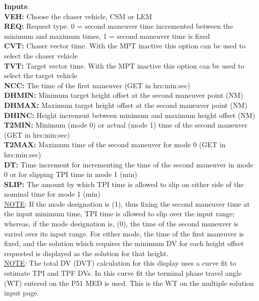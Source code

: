 \documentclass[11pt]{article} %
\begin{document}
\textbf{Inputs}:\\

\textbf{VEH:} Choose the chaser vehicle, CSM or LEM\\
\textbf{REQ:} Request type. 0 = second maneuver time incremented between the minimum and maximum times, 1 = second maneuver time is fixed\\
\textbf{CVT:} Chaser vector time. With the MPT inactive this option can be used to select the chaser vehicle\\
\textbf{TVT:} Target vector time. With the MPT inactive this option can be used to select the target vehicle\\
\textbf{NCC:} The time of the first maneuver (GET in hrs:min:sec)\\
\textbf{DHMIN:} Minimum target height offset at the second maneuver point (NM)\\
\textbf{DHMAX:} Maximum target height offset at the second maneuver point (NM)\\
\textbf{DHINC:} Height increment between minimum and maximum height offset (NM)\\
\textbf{T2MIN:} Minimum (mode 0) or actual (mode 1) time of the second maneuver (GET in hrs:min:sec)\\
\textbf{T2MAX:} Maximum time of the second maneuver for mode 0 (GET in hrs:min:sec)\\
\textbf{DT:} Time increment for incrementing the time of the second maneuver in mode 0 or for slipping TPI time in mode 1 (min)\\
\textbf{SLIP:} The amount by which TPI time is allowed to slip on either side of the nominal time for mode 1 (min)\\

\underline{NOTE}: If the mode designation is (1), thus fixing the second maneuver time at the input minimum time, TPI time is allowed to slip over the input range; whereas, if the mode designation is, (0), the time of the second maneuver is varied over its input range. For either mode, the time of the first maneuver is fixed, and the solution which requires the minimum DV for each height offset requested is displayed as the solution for that height.\\

\underline{NOTE}: The total DV (DVT) calculation for this display uses a curve fit to estimate TPI and TPF DVs. In this curve fit the terminal phase travel angle (WT) entered on the P51 MED is used. This is the WT on the multiple solution input page.\\
\end{document}
